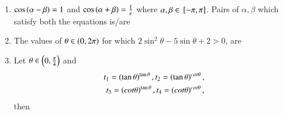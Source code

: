 \documentclass[journal,12pt,twocolumn,article]{IEEEtran}
\theoremstyle{remark}
\begin{document}
\begin{enumerate}[start = 20]
\begin{enumerate}
\begin{multicols}{2}
\item $(\frac{2\pi}{3},\frac{5\pi}{6}]$
\columnbreak
\item $(\frac{5\pi}{6},\pi]$
\end{multicols}
\end{enumerate}
\item $\cos\left(\alpha - \beta\right)=1$ and $\cos\left(\alpha + \beta\right)=\frac{1}{e}$ where $\alpha, \beta \in {}\left[-\pi,\pi\right]$. Pairs of $\alpha, \beta$ which satisfy both the equations is/are
\hfill{}
\begin{enumerate}
\end{enumerate}
\item The values of $\theta \in \left(0,2\pi\right)$ for which $2\sin^2\theta - 5\sin\theta + 2 > 0$, are
\hfill{}
\begin{enumerate}
\end{enumerate}
\item Let $\theta \in \left(0,\frac{\pi}{4}\right)$ and 
\begin{align*}
t_1 = \left(\tan\theta\right)^{\tan\theta}, t_2 = \left(\tan\theta\right)^{cot\theta},\\t_3 = \left(cot\theta\right)^{\tan\theta}, t_4 = \left(cot\theta\right)^{cot\theta},
\end{align*} then
\hfill{}

\end{enumerate}
\end{document}
